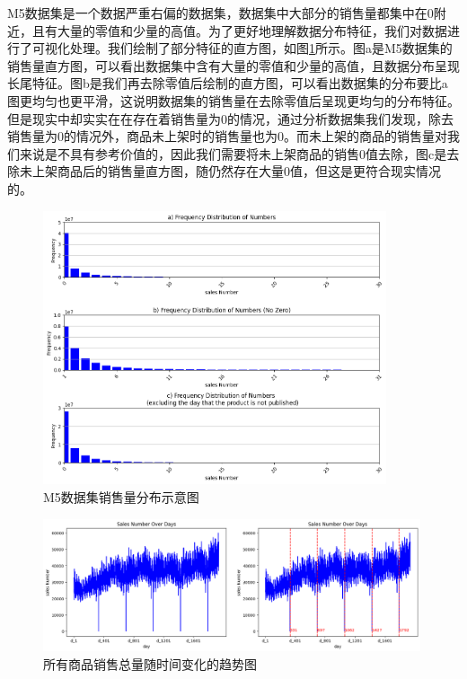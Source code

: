 \documentclass[12pt]{article}
\begin{document}
M5数据集是一个数据严重右偏的数据集，数据集中大部分的销售量都集中在0附近，且有大量的零值和少量的高值。为了更好地理解数据分布特征，我们对数据进行了可视化处理。我们绘制了部分特征的直方图，如图\ref{fig:data_distribution}所示。图a是M5数据集的销售量直方图，可以看出数据集中含有大量的零值和少量的高值，且数据分布呈现长尾特征。图b是我们再去除零值后绘制的直方图，可以看出数据集的分布要比a图更均匀也更平滑，这说明数据集的销售量在去除零值后呈现更均匀的分布特征。但是现实中却实实在在存在着销售量为0的情况，通过分析数据集我们发现，除去销售量为0的情况外，商品未上架时的销售量也为0。而未上架的商品的销售量对我们来说是不具有参考价值的，因此我们需要将未上架商品的销售0值去除，图c是去除未上架商品后的销售量直方图，随仍然存在大量0值，但这是更符合现实情况的。

\begin{figure}
    \centering
    \includegraphics[width=0.9\textwidth]{image/data_distribution.png}
    \caption{M5数据集销售量分布示意图}
    \label{fig:data_distribution}
\end{figure}

\begin{figure}
    \centering
    \includegraphics[width=0.99\textwidth]{image/Sales_over_day.png}
    \caption{所有商品销售总量随时间变化的趋势图}
    \label{fig:Sales_over_day}
\end{figure}
\end{document}
